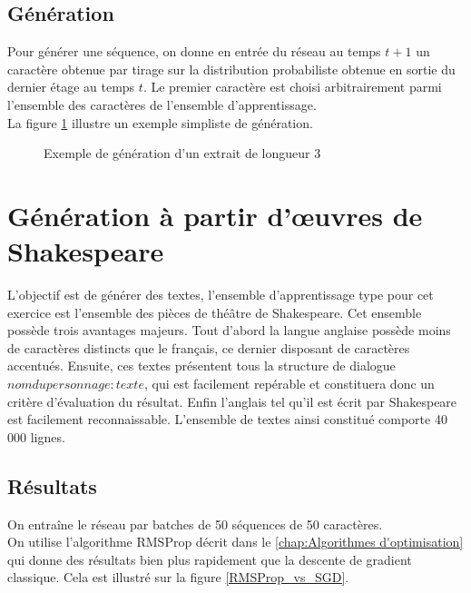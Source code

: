\subsection{Génération}


Pour générer une séquence, on donne en entrée du réseau au temps $t+1$ un caractère obtenue par tirage sur la distribution probabiliste obtenue en sortie du dernier étage au temps $t$.
Le premier caractère est choisi arbitrairement parmi l'ensemble des caractères de l'ensemble d'apprentissage.
\\La figure \ref{LSTM_generate} illustre un exemple simpliste de génération.

\begin{figure}[H]
\centering
\resizebox{1\linewidth}{!}{}
\caption{Exemple de génération d'un extrait de longueur 3}
\label{LSTM_generate}
\end{figure}

\section{Génération à partir d'œuvres de Shakespeare}
L'objectif est de générer des textes, l'ensemble d'apprentissage type pour cet exercice est l'ensemble des pièces de théâtre de Shakespeare. Cet ensemble possède trois avantages majeurs. Tout d'abord la langue anglaise possède moins de caractères distincts que le français, ce dernier disposant de caractères accentués. Ensuite, ces textes présentent tous la structure de dialogue $nom du personnage : texte$, qui est facilement repérable et constituera donc un critère d'évaluation du résultat. Enfin l'anglais tel qu'il est écrit par Shakespeare est facilement reconnaissable.
L'ensemble de textes ainsi constitué comporte 40 000 lignes.

\subsection{Résultats}

On entraîne le réseau par batches de 50 séquences de 50 caractères.
\\On utilise l'algorithme RMSProp décrit dans le \autoref{chap:Algorithmes d'optimisation} qui donne des résultats bien plus rapidement que la descente de gradient classique. Cela est illustré sur la figure \ref{RMSProp_vs_SGD}.


